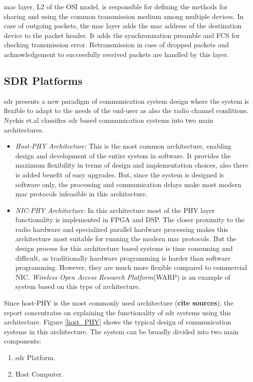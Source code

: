 \ac{mac} layer, \ac{L2} of the \ac{OSI} model, is responsible for defining the methods for sharing and using the common transmission medium among multiple devices.
In case of outgoing packets, the \ac{mac} layer adds the \ac{mac} address of the destination device to the packet header.
It adds the synchronization preamble and \ac{FCS} for checking transmission error.
Retransmission in case of dropped packets and acknowledgement to successfully received packets are handled by this layer.\\
 

\subsection{SDR Platforms}

\ac{sdr} presents a new paradigm of communication system design where the system is flexible to adapt to the needs of the end-user as also the radio channel conditions. Nychis et.al \cite{nychis_enabling_nodate} classifies \ac{sdr} based communication systems into two main architectures.
\begin{itemize} 
\item{\textit{Host-PHY Architecture:} This is the most common architecture, enabling design and development of the entire system in software.
It provides the maximum flexibility in terms of design and implementation choices, also there is added benefit of easy upgrades.
But, since the system is designed is software only, the processing and communication delays make most modern \ac{mac} protocols infeasible in this architecture.}


\item{\textit{NIC-PHY Architecture:} In this architecture most of the \ac{PHY} layer functionality is implemented in \ac{FPGA} and \ac{DSP}.
The closer proximity to the radio hardware and specialized parallel hardware processing makes this architecture most suitable for running the modern \ac{mac} protocols.
But the design process for this architecture based systems is time consuming and difficult, as traditionally hardware programming is harder than software programming.
However, they are much more flexible compared to commercial \ac{NIC}.
\textit{Wireless Open Access Research Platform}(WARP) \cite{noauthor_warp_nodate} is an example of system based on this type of architecture.}

\end{itemize}
Since host-PHY \cite{nychis_enabling_nodate} is the most commonly used architecture (\textbf{cite sources}), the report concentrates on explaining the functionality of \ac{sdr} systems using this architecture.
Figure \ref{host_PHY} shows the typical design of communication systems in this architecture. The system can be broadly divided into two main components:
\begin{enumerate}
\item{\ac{sdr} Platform.}
\item{Host Computer.}
\end{enumerate}


